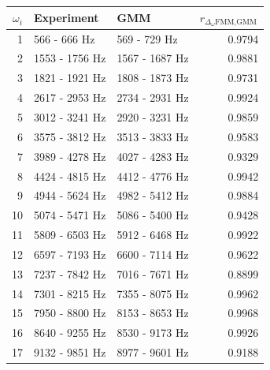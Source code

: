 \begin{tabular}{rllr}
\hline
   $\omega_i$ & Experiment          & GMM                 &   $r_{\Delta_{\omega}{\text{FMM},\text{GMM}}}$ \\
\hline
             1 & 566 -       666 Hz  & 569 -       729 Hz  &       0.9794 \\
             2 & 1553 -      1756 Hz & 1567 -      1687 Hz &       0.9881 \\
             3 & 1821 -      1921 Hz & 1808 -      1873 Hz &       0.9731 \\
             4 & 2617 -      2953 Hz & 2734 -      2931 Hz &       0.9924 \\
             5 & 3012 -      3241 Hz & 2920 -      3231 Hz &       0.9859 \\
             6 & 3575 -      3812 Hz & 3513 -      3833 Hz &       0.9583 \\
             7 & 3989 -      4278 Hz & 4027 -      4283 Hz &       0.9329 \\
             8 & 4424 -      4815 Hz & 4412 -      4776 Hz &       0.9942 \\
             9 & 4944 -      5624 Hz & 4982 -      5412 Hz &       0.9884 \\
            10 & 5074 -      5471 Hz & 5086 -      5400 Hz &       0.9428 \\
            11 & 5809 -      6503 Hz & 5912 -      6468 Hz &       0.9922 \\
            12 & 6597 -      7193 Hz & 6600 -      7114 Hz &       0.9622 \\
            13 & 7237 -      7842 Hz & 7016 -      7671 Hz &       0.8899 \\
            14 & 7301 -      8215 Hz & 7355 -      8075 Hz &       0.9962 \\
            15 & 7950 -      8800 Hz & 8153 -      8653 Hz &       0.9968 \\
            16 & 8640 -      9255 Hz & 8530 -      9173 Hz &       0.9926 \\
            17 & 9132 -      9851 Hz & 8977 -      9601 Hz &       0.9188 \\
\hline
\end{tabular}
